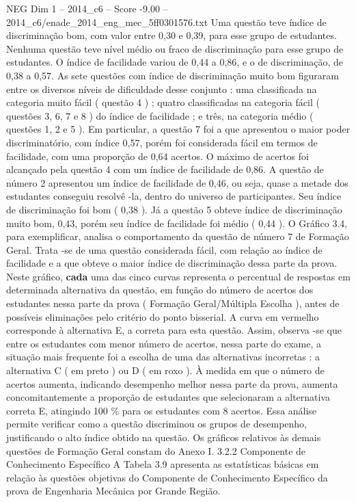 \begin{textsample}{NEG Dim 1 – 2014\_c6 – Score -9.00 – 2014\_c6/enade\_2014\_eng\_mec\_5ff0301576.txt}
Uma questão teve índice de discriminação bom, com valor entre 0,30 e 0,39, para esse grupo de estudantes.
Nenhuma questão teve nível médio ou fraco de discriminação para esse grupo de estudantes.
O índice de facilidade variou de 0,44 a 0,86, e o de discriminação, de 0,38 a 0,57.
As sete questões com índice de discriminação muito bom figuraram entre os diversos níveis de dificuldade desse conjunto : uma classificada na categoria muito fácil ( questão 4 ) ; quatro classificadas na categoria fácil ( questões 3, 6, 7 e 8 ) do índice de facilidade ; e três, na categoria médio ( questões 1, 2 e 5 ).
Em particular, a questão 7 foi a que apresentou o maior poder discriminatório, com índice 0,57, porém foi considerada fácil em termos de facilidade, com uma proporção de 0,64 acertos.
O máximo de acertos foi alcançado pela questão 4 com um índice de facilidade de 0,86.
A questão de número 2 apresentou um índice de facilidade de 0,46, ou seja, quase a metade dos estudantes conseguiu resolvê -la, dentro do universo de participantes.
Seu índice de discriminação foi bom ( 0,38 ).
Já a questão 5 obteve índice de discriminação muito bom, 0,43, porém seu índice de facilidade foi médio ( 0,44 ).
O Gráfico 3.4, para exemplificar, analisa o comportamento da questão de número 7 de Formação Geral.
Trata -se de uma questão considerada fácil, com relação ao índice de facilidade e a que obteve o maior índice de discriminação dessa parte da prova.
Neste gráfico, \textbf{cada} uma das cinco curvas representa o percentual de respostas em determinada alternativa da questão, em função do número de acertos dos estudantes nessa parte da prova ( Formação Geral/Múltipla Escolha ), antes de possíveis eliminações pelo critério do ponto bisserial.
A curva em vermelho corresponde à alternativa E, a correta para esta questão.
Assim, observa -se que entre os estudantes com menor número de acertos, nessa parte do exame, a situação mais frequente foi a escolha de uma das alternativas incorretas : a alternativa C ( em preto ) ou D ( em roxo ).
À medida em que o número de acertos aumenta, indicando desempenho melhor nessa parte da prova, aumenta concomitantemente a proporção de estudantes que selecionaram a alternativa correta E, atingindo 100 \% para os estudantes com 8 acertos.
Essa análise permite verificar como a questão discriminou os grupos de desempenho, justificando o alto índice obtido na questão.
Os gráficos relativos às demais questões de Formação Geral constam do Anexo I. 3.2.2 Componente de Conhecimento Específico A Tabela 3.9 apresenta as estatísticas básicas em relação às questões objetivas do Componente de Conhecimento Específico da prova de Engenharia Mecânica por Grande Região.

\end{textsample}
